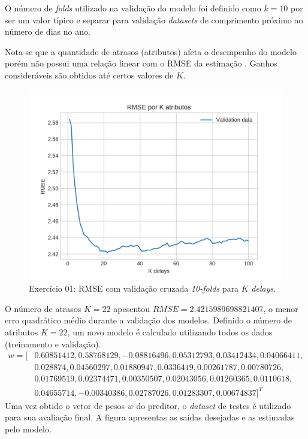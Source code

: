 \documentclass{article}
\begin{document}
    O número de \textit{folds} utilizado na validação do modelo foi definido como $k=10$ por ser um valor
    típico e separar para validação \textit{datasets} de comprimento próximo ao número de dias no ano. 
    
    Nota-se que a quantidade de atrasos (atributos) afeta o desempenho do modelo
    porém não possui uma relação linear com o RMSE da estimação . Ganhos consideráveis
    são obtidos até certos valores de $K$.
    \begin{figure}[H]
        \centering
        \includegraphics[width=\linewidth]{ex01/folds.png}
        \caption{Exercício 01: RMSE com validação cruzada \textit{10-folds} para $K$ \textit{delays}.}
        \label{fig:ex1_kfold_rmse}
    \end{figure}
    O número de atrasos $K=22$ apesentou $RMSE=2.4215989698821407$, o menor erro quadrático médio durante a validação dos modelos.
    Definido o número de atributos $K=22$, um novo modelo é calculado utilizando todos os dados (treinamento e validação).
    \begin{align*}
w=[ &0.60851412, 0.58768129, -0.08816496, 0.05312793, 0.03412434, 0.04066411, \\
    &0.028874  , 0.04560297,  0.01880947, 0.0336419,  0.00261787, 0.00780726, \\
    &0.01769519, 0.02374471,  0.00350507,  0.02043056,0.01260365, 0.0110618,  \\
    & 0.04655714, -0.00340386,  0.02787026,  0.01283307,  0.00674837]^T
    \end{align*}
    Uma vez obtido o vetor de pesos $w$ do preditor, o \textit{dataset} de testes é utilizado para
    sua avaliação final. A figura  apresentas as saídas desejadas e as estimadas pelo modelo.
\end{document}
